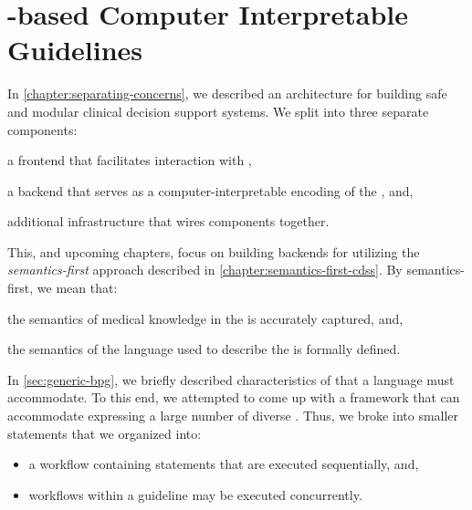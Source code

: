 \chapter{\K{}-based Computer Interpretable Guidelines}\label{chapter:k-based-guidelines}

In \autoref{chapter:separating-concerns}, we described an
architecture for building safe and modular clinical decision support systems.
We split \CDSSs{} into three separate components:
\begin{enumerate*}[label=(\alph*)]
  \item a frontend that facilitates interaction with \HCPs{},
  \item a backend that serves as a computer-interpretable encoding of the \BPG{}, and,
  \item additional infrastructure that wires components together.
\end{enumerate*}
This, and upcoming chapters, focus on building backends for \CDSSs{}
utilizing the \emph{semantics-first} approach described in
\autoref{chapter:semantics-first-cdss}. By semantics-first, we
mean that:
\begin{enumerate*}[label=(\alph*)]
 \item the semantics of medical knowledge in the \BPG{} is
 accurately captured, and,
 \item the semantics of the language used to describe the
 \BPG{} is formally defined.
\end{enumerate*}

In \autoref{sec:generic-bpg}, we briefly described characteristics
of \BPGs{} that a \CIG{} language must accommodate.
To this end, we attempted to come up with a framework that
can accommodate expressing a large number of diverse \BPGs{}.
Thus, we broke \BPGs{} into smaller statements that we organized
into:
\begin{itemize}
  \item a workflow containing statements that are executed sequentially, and,
  \item workflows within a guideline may be executed concurrently.
\end{itemize}

